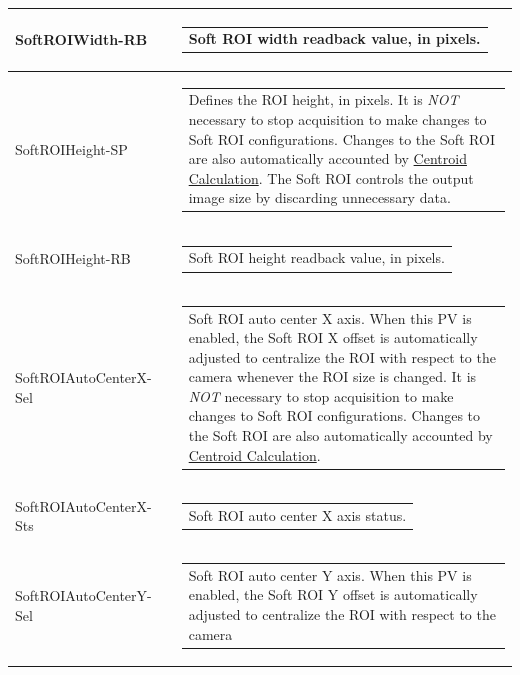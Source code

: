 \documentclass[openany]{article}
\begin{document}
\begin{longtable}{| m{3.0cm} m{4.5cm} m{7.0cm} |}
        SoftROIWidth-RB &  & \begin{tabular}{@{}m{6cm}@{}}
                Soft ROI width readback value, in pixels.
            \end{tabular} \hypertarget{pv:soft-roi-height}{}\\ \hline
        SoftROIHeight-SP &  & \begin{tabular}{@{}m{6cm}@{}}
                Defines the ROI height, in pixels. It is \emph{NOT} necessary to stop
                acquisition to make changes to Soft ROI configurations. Changes to the
                Soft ROI are also automatically accounted by 
                \hyperref[sec:centroid-calc]{Centroid Calculation}.
                The Soft ROI controls the output image size by discarding unnecessary data.
            \end{tabular} \\ \hline
        SoftROIHeight-RB &  & \begin{tabular}{@{}m{6cm}@{}}
                Soft ROI height readback value, in pixels.
            \end{tabular} \hypertarget{pv:soft-roi-auto-center-x}{}\\ \hline
        SoftROIAutoCenterX-Sel &  & \begin{tabular}{@{}m{6cm}@{}}
                Soft ROI auto center X axis. When this PV is enabled, the Soft ROI X offset 
                is automatically adjusted to centralize the ROI with respect to the camera
                whenever the ROI size is changed. It is \emph{NOT} necessary to stop
                acquisition to make changes to Soft ROI configurations. Changes to the
                Soft ROI are also automatically accounted by 
                \hyperref[sec:centroid-calc]{Centroid Calculation}.
            \end{tabular} \\ \hline
        SoftROIAutoCenterX-Sts &  & \begin{tabular}{@{}m{6cm}@{}}
                Soft ROI auto center X axis status.
            \end{tabular} \hypertarget{pv:soft-roi-auto-center-y}{}\\ \hline
        SoftROIAutoCenterY-Sel &  & \begin{tabular}{@{}m{6cm}@{}}
                Soft ROI auto center Y axis. When this PV is enabled, the Soft ROI Y offset 
                is automatically adjusted to centralize the ROI with respect to the camera

\end{tabular}
\end{longtable}
\end{document}
